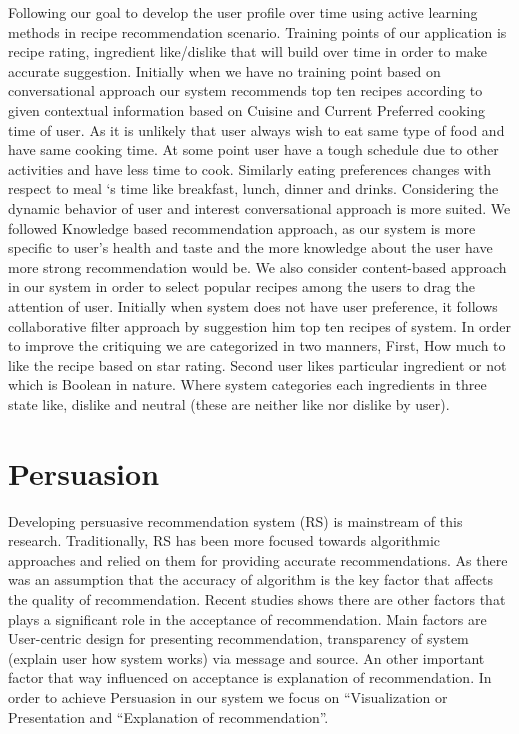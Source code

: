 Following our goal to develop the user profile over time using active learning methods in recipe recommendation scenario. Training points of our application is recipe rating, ingredient like/dislike that will build over time in order to make accurate suggestion. Initially when we have no training point based on conversational approach our system recommends top ten recipes according to given contextual information based on Cuisine and Current Preferred cooking time of user. As it is unlikely that user always wish to eat same type of food and have same cooking time. At some point user have a tough schedule due to other activities and have less time to cook. Similarly eating preferences changes with respect to meal ‘s time like breakfast, lunch, dinner and drinks. Considering the dynamic behavior of user and interest conversational approach is more suited. We followed Knowledge based recommendation approach, as our system is more specific to user’s health and taste and the more knowledge about the user have more strong recommendation would be. We also consider content-based approach in our system in order to select popular recipes among the users to drag the attention of user. Initially when system does not have user preference, it follows collaborative filter approach by suggestion him top ten recipes of system. In order to improve the critiquing we are categorized in two manners, First, How much to like the recipe based on star rating. Second user likes particular ingredient or not which is Boolean in nature. Where system categories each ingredients in three state like, dislike and neutral (these are neither like nor dislike by user).  
	
\section{Persuasion}

Developing persuasive recommendation system (RS) is mainstream of this research. Traditionally, RS has been more focused towards algorithmic approaches and relied on them for providing accurate recommendations. As there was an assumption that the accuracy of algorithm is the key factor that affects the quality of recommendation. Recent studies shows there are other factors that plays a significant role in the acceptance of recommendation. Main factors are User-centric design for presenting recommendation, transparency of system (explain user how system works) via message and source. An other important factor that way influenced on acceptance is explanation of recommendation\cite{gkika2014persuasive}. In order to achieve Persuasion in our system we focus on   “Visualization or Presentation \cite{nanou2010effects} \cite{pu2006trust} and “Explanation of recommendation\cite{cialdini2009influence}\cite{fogg1998persuasive}”.
  
